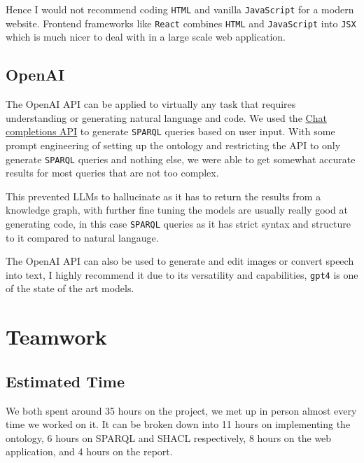 \documentclass{article}
\begin{document}
Hence I would not recommend coding \verb|HTML| and vanilla \verb|JavaScript| for a modern website. Frontend frameworks like \verb|React| combines \verb|HTML| and \verb|JavaScript| into \verb|JSX| which is much nicer to deal with in a large scale web application.
\subsection*{OpenAI}
The OpenAI API can be applied to virtually any task that requires understanding or generating natural language and code. We used the \href{https://platform.openai.com/docs/guides/gpt/chat-completions-api}{Chat completions API} to generate \verb|SPARQL| queries based on user input. With some prompt engineering of setting up the ontology and restricting the API to only generate \verb|SPARQL| queries and nothing else, we were able to get somewhat accurate results for most queries that are not too complex.

This prevented LLMs to hallucinate as it has to return the results from a knowledge graph, with further fine tuning the models are usually really good at generating code, in this case \verb|SPARQL| queries as it has strict syntax and structure to it compared to natural langauge.

The OpenAI API can also be used to generate and edit images or convert speech into text, I highly recommend it due to its versatility and capabilities, \verb|gpt4|	is one of the state of the art models.

\section*{Teamwork}
\subsection*{Estimated Time}
We both spent around 35 hours on the project, we met up in person almost every time we worked on it. It can be broken down into 11 hours on implementing the ontology, 6 hours on SPARQL and SHACL respectively, 8 hours on the web application, and 4 hours on the report.
\end{document}
